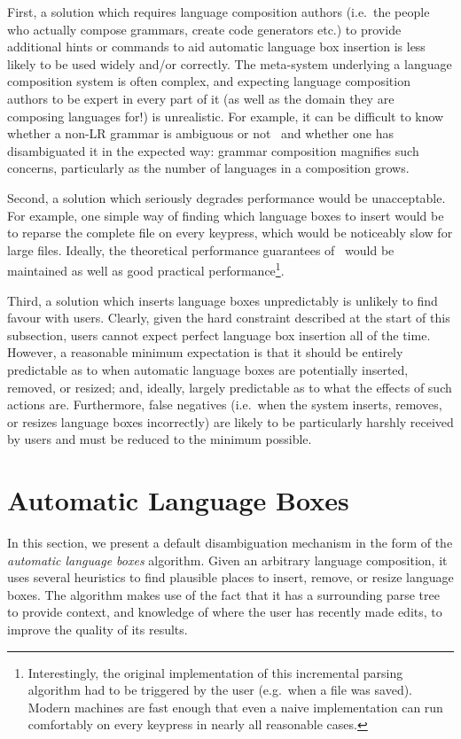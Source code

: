 \documentclass[sigplan,screen]{acmart}
\begin{document}
First, a solution which requires language composition authors (i.e.~the people
who actually compose grammars, create code generators etc.) to provide additional
hints or commands to aid automatic language box insertion is less likely
to be used widely and/or correctly. The meta-system underlying a language
composition system is often complex, and expecting language composition authors
to be expert in every part of it (as well as the domain they are composing
languages for!) is unrealistic. For example, it can be difficult to know whether
a non-LR grammar is ambiguous or not~\cite{vasudevan13detecting} and whether
one has disambiguated it in the expected way: grammar
composition magnifies such concerns, particularly as the number of languages
in a composition grows.

Second, a solution which seriously degrades performance would be unacceptable.
For example, one simple way of finding which language boxes to insert would
be to reparse the complete file on every keypress, which would be noticeably slow for large
files. Ideally, the theoretical performance guarantees
of~\citet{wagner98practicalalgorithms} would be maintained as well as good
practical performance\footnote{Interestingly, the original implementation of
this incremental parsing algorithm had to be triggered by the user (e.g.~when
a file was saved). Modern machines are fast enough that even a naive
implementation can run comfortably on every keypress in nearly all reasonable
cases.}.

Third, a solution which inserts language boxes unpredictably is unlikely
to find favour with users. Clearly, given the hard constraint described at the
start of this subsection, users cannot expect perfect language box insertion
all of the time. However, a reasonable minimum expectation is that it should be
entirely predictable as to when automatic language boxes are potentially
inserted, removed, or
resized; and, ideally, largely predictable as to what the effects of such
actions are. Furthermore, false negatives (i.e.~when the system inserts, removes,
or resizes language boxes incorrectly) are likely to be particularly harshly
received by users and must be reduced to the minimum possible.


\section{Automatic Language Boxes}

In this section, we present a default disambiguation mechanism in the form of
the \emph{automatic language boxes} algorithm. Given an arbitrary language
composition, it uses several heuristics to find plausible places to insert,
remove, or resize language boxes. The algorithm makes use of the fact that it
has a surrounding parse tree to provide context, and knowledge of where
the user has recently made edits, to improve the quality of its results.
\end{document}
